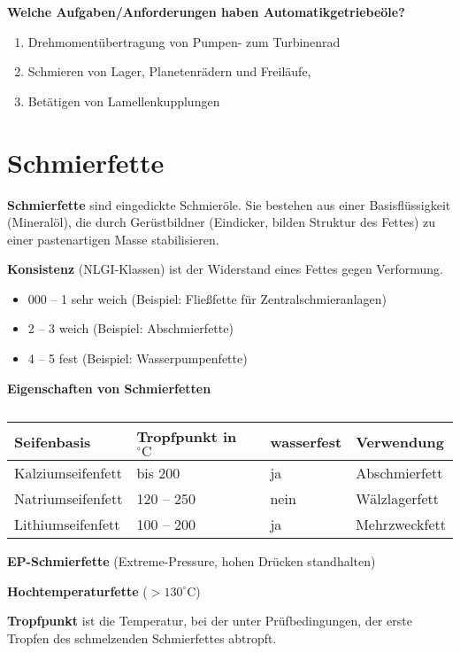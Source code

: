 \textbf{Welche Aufgaben/Anforderungen haben Automatikgetriebeöle?}

\begin{enumerate}
\item
  Drehmomentübertragung von Pumpen- zum Turbinenrad
\item
  Schmieren von Lager, Planetenrädern und Freiläufe,
\item
  Betätigen von Lamellenkupplungen
\end{enumerate}

\section{Schmierfette}\label{schmierfette}

\textbf{Schmierfette} sind eingedickte Schmieröle. Sie bestehen aus
einer Basisflüssigkeit (Mineralöl), die durch Gerüstbildner (Eindicker,
bilden Struktur des Fettes) zu einer pastenartigen Masse stabilisieren.

\textbf{Konsistenz} (NLGI-Klassen) ist der Widerstand eines Fettes gegen
Verformung.

\begin{itemize}
\item
  000 -- 1 sehr weich (Beispiel: Fließfette für Zentralschmieranlagen)
\item
  2 -- 3 weich (Beispiel: Abschmierfette)
\item
  4 -- 5 fest (Beispiel: Wasserpumpenfette)
\end{itemize}

\textbf{Eigenschaften von Schmierfetten}

\begin{table}[!ht]%
\centering 
	\caption{}%
\begin{tabular}{@{}llll@{}}
\hline
\textbf{Seifenbasis} & \textbf{Tropfpunkt} in $^\circ\text{C}$ &
\textbf{wasserfest} & \textbf{Verwendung} \\
\hline
Kalziumseifenfett & bis 200 & ja & Abschmierfett \\
Natriumseifenfett & 120 -- 250 & nein & Wälzlagerfett \\
Lithiumseifenfett & 100 -- 200 & ja & Mehrzweckfett \\
\hline
\end{tabular} 
\end{table}

\textbf{EP-Schmierfette} (Extreme-Pressure, hohen Drücken standhalten)

\textbf{Hochtemperaturfette} ($> 130^\circ\text{C}$)

\textbf{Tropfpunkt} ist die Temperatur, bei der unter Prüfbedingungen,
der erste Tropfen des schmelzenden Schmierfettes abtropft.
